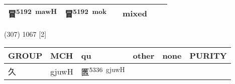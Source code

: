 \documentclass[14pt,a4paper]{scrartcl}
\begin{document}
\begin{longtable}[c]{@{}llllll@{}}
\begin{minipage}[t]{0.14\columnwidth}
冒\textsuperscript{5192~mawH}
\strut\end{minipage} &
\begin{minipage}[t]{0.14\columnwidth}\raggedright\strut
冒\textsuperscript{5192~mok}
\strut\end{minipage} &
\begin{minipage}[t]{0.14\columnwidth}\raggedright\strut
\strut\end{minipage} &
\begin{minipage}[t]{0.14\columnwidth}\raggedright\strut
mixed
\strut\end{minipage}\tabularnewline
\bottomrule
\end{longtable}

(307) 1067 {[}2{]}

\begin{longtable}[c]{@{}llllll@{}}
\toprule
\begin{minipage}[b]{0.14\columnwidth}\raggedright\strut
GROUP
\strut\end{minipage} &
\begin{minipage}[b]{0.14\columnwidth}\raggedright\strut
MCH
\strut\end{minipage} &
\begin{minipage}[b]{0.14\columnwidth}\raggedright\strut
qu
\strut\end{minipage} &
\begin{minipage}[b]{0.14\columnwidth}\raggedright\strut
other
\strut\end{minipage} &
\begin{minipage}[b]{0.14\columnwidth}\raggedright\strut
none
\strut\end{minipage} &
\begin{minipage}[b]{0.14\columnwidth}\raggedright\strut
PURITY
\strut\end{minipage}\tabularnewline
\midrule
\endhead
\begin{minipage}[t]{0.14\columnwidth}\raggedright\strut
久
\strut\end{minipage} &
\begin{minipage}[t]{0.14\columnwidth}\raggedright\strut
gjuwH
\strut\end{minipage} &
\begin{minipage}[t]{0.14\columnwidth}\raggedright\strut
匶\textsuperscript{5336~gjuwH}
\strut\end{minipage} &
\begin{minipage}[t]{0.14\columnwidth}\raggedright\strut
\strut\end{minipage} &
\begin{minipage}[t]{0.14\columnwidth}\raggedright\strut

\end{minipage}
\end{longtable}
\end{document}
